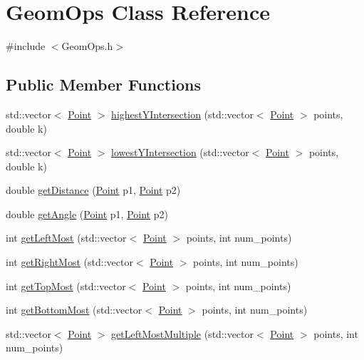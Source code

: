 \hypertarget{classGeomOps}{}\section{Geom\+Ops Class Reference}
\label{classGeomOps}


{\ttfamily \#include $<$Geom\+Ops.\+h$>$}

\subsection*{Public Member Functions}
\begin{DoxyCompactItemize}
\item 
std\+::vector$<$ \hyperlink{classPoint}{Point} $>$ \hyperlink{classGeomOps_a1c86fdb20bc2c6667fc0c0a4e06dd180}{highest\+Y\+Intersection} (std\+::vector$<$ \hyperlink{classPoint}{Point} $>$ points, double k)
\item 
std\+::vector$<$ \hyperlink{classPoint}{Point} $>$ \hyperlink{classGeomOps_a4dc89814b38593ac562c5d9cef3739df}{lowest\+Y\+Intersection} (std\+::vector$<$ \hyperlink{classPoint}{Point} $>$ points, double k)
\item 
double \hyperlink{classGeomOps_a4febafe2cb836369319d1280f1d73d1b}{get\+Distance} (\hyperlink{classPoint}{Point} p1, \hyperlink{classPoint}{Point} p2)
\item 
double \hyperlink{classGeomOps_aa043ea44a94e23c17ee6aa56d71ac1ef}{get\+Angle} (\hyperlink{classPoint}{Point} p1, \hyperlink{classPoint}{Point} p2)
\item 
int \hyperlink{classGeomOps_aa940ff28b586d95c2cbda894d635c332}{get\+Left\+Most} (std\+::vector$<$ \hyperlink{classPoint}{Point} $>$ points, int num\+\_\+points)
\item 
int \hyperlink{classGeomOps_adfa6200d7fd59612b2adce1c5ce6b291}{get\+Right\+Most} (std\+::vector$<$ \hyperlink{classPoint}{Point} $>$ points, int num\+\_\+points)
\item 
int \hyperlink{classGeomOps_adbbed35b057f010311831b409c4a07f8}{get\+Top\+Most} (std\+::vector$<$ \hyperlink{classPoint}{Point} $>$ points, int num\+\_\+points)
\item 
int \hyperlink{classGeomOps_a64f2985b274cb5055d838e4011a59345}{get\+Bottom\+Most} (std\+::vector$<$ \hyperlink{classPoint}{Point} $>$ points, int num\+\_\+points)
\item 
std\+::vector$<$ \hyperlink{classPoint}{Point} $>$ \hyperlink{classGeomOps_abecf90c2d943a31d42767dad3f7e1c9e}{get\+Left\+Most\+Multiple} (std\+::vector$<$ \hyperlink{classPoint}{Point} $>$ points, int num\+\_\+points)

\end{DoxyCompactItemize}
